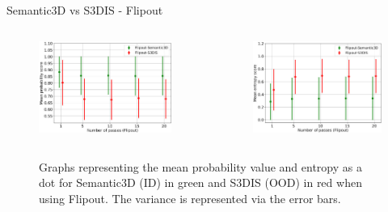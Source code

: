 \documentclass[aspectratio=169]{beamer}
\begin{document}
\begin{frame}{Semantic3D vs S3DIS - Flipout}
    \begin{columns}
        \begin{column}{0.5\textwidth}
            \begin{figure}
                \centering
                \includegraphics[scale=0.28]{images/ood1/MSP_Mean_OOD1_Fout.jpg}
            \end{figure}
        \end{column}
        \begin{column}{0.5\textwidth}
            \begin{figure}
                \centering
                \includegraphics[scale=0.28]{images/ood1/Ent_Mean_OOD1_Fout.jpg}
            \end{figure}
        \end{column}
    \end{columns}
    \begin{figure}
        \caption{Graphs representing the mean probability value and entropy as a dot for Semantic3D (ID) in green and
        S3DIS (OOD) in red when using Flipout. The variance is represented via the error bars.}
    \end{figure}
\end{frame}
\end{document}
